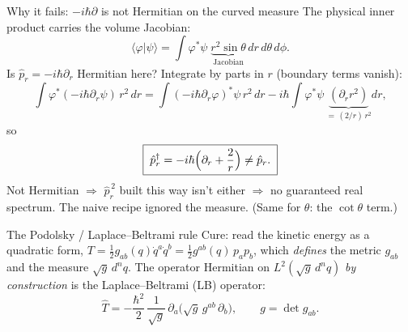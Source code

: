 \documentclass[aspectratio=169,10pt]{beamer}
\newcommand{\stagenum}{0}
\newcommand{\setstage}[1]{\renewcommand{\stagenum}{#1}}
\begin{document}
\begin{frame}{Why it fails: $-i\hbar\partial$ is not Hermitian on the curved measure}
\setstage{3}
The physical inner product carries the volume Jacobian:
\begin{equation*}
\langle\varphi|\psi\rangle=\int\varphi^{*}\psi\;\underbrace{r^2\sin\theta}_{\text{Jacobian}}\,dr\,d\theta\,d\phi .
\end{equation*}
Is $\hat p_r=-i\hbar\partial_r$ Hermitian here? Integrate by parts in $r$ (boundary terms vanish):
\begin{equation*}
\int\varphi^{*}(-i\hbar\partial_r\psi)\,r^2\,dr
=\int(-i\hbar\partial_r\varphi)^{*}\psi\,r^2\,dr
-i\hbar\int\varphi^{*}\psi\,\underbrace{(\partial_r r^2)}_{=\,(2/r)\,r^2}dr,
\end{equation*}
so
\begin{equation*}
\boxed{\;\hat p_r^{\dagger}=-i\hbar\Bigl(\partial_r+\frac{2}{r}\Bigr)\neq\hat p_r.\;}
\end{equation*}
Not Hermitian $\Rightarrow$ $\hat p_r^{\,2}$ built this way isn't either $\Rightarrow$ no guaranteed real spectrum. The naive recipe \alert{ignored the measure}. (Same for $\theta$: the $\cot\theta$ term.)
\end{frame}

\begin{frame}{The Podolsky / Laplace--Beltrami rule}
\setstage{3}
Cure: read the kinetic energy as a quadratic form, $T=\tfrac12 g_{ab}(q)\dot q^a\dot q^b=\tfrac12 g^{ab}(q)\,p_ap_b$, which \emph{defines} the metric $g_{ab}$ and the measure $\sqrt g\,d^nq$. The operator Hermitian on $L^2(\sqrt g\,d^nq)$ \emph{by construction} is the Laplace--Beltrami (\alert{LB}) operator:
\begin{equation*}
\boxed{\;\hat T=-\frac{\hbar^2}{2}\,\frac{1}{\sqrt g}\,\partial_a\!\bigl(\sqrt g\,g^{ab}\,\partial_b\bigr),\qquad g=\det g_{ab}.\;}\tag{4.5}
\end{equation*}
\end{frame}
\end{document}
